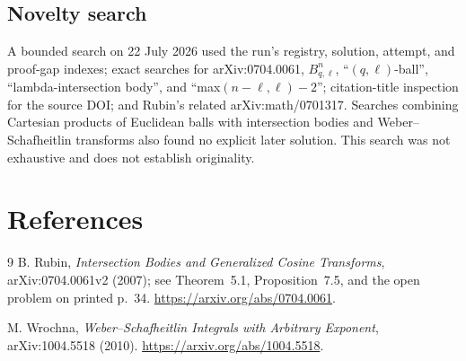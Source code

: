 \documentclass[11pt]{article}
\theoremstyle{remark}
\begin{document}
\subsection*{Novelty search}
A bounded search on 22 July 2026 used the run's registry, solution, attempt,
and proof-gap indexes; exact searches for arXiv:0704.0061, $B^n_{q,\ell}$,
``$(q,\ell)$-ball'', ``lambda-intersection body'', and
``max$(n-\ell,\ell)-2$''; citation-title inspection for the source DOI; and
Rubin's related arXiv:math/0701317.  Searches combining Cartesian products of
Euclidean balls with intersection bodies and Weber--Schafheitlin transforms
also found no explicit later solution.  This search was not exhaustive and
does not establish originality.

\section{References}

\begin{thebibliography}{9}
B. Rubin,
\emph{Intersection Bodies and Generalized Cosine Transforms},
arXiv:0704.0061v2 (2007); see Theorem~5.1, Proposition~7.5, and the open
problem on printed p.~34.
\url{https://arxiv.org/abs/0704.0061}.

M. Wrochna,
\emph{Weber--Schafheitlin Integrals with Arbitrary Exponent},
arXiv:1004.5518 (2010).
\url{https://arxiv.org/abs/1004.5518}.
\end{thebibliography}
\end{document}
